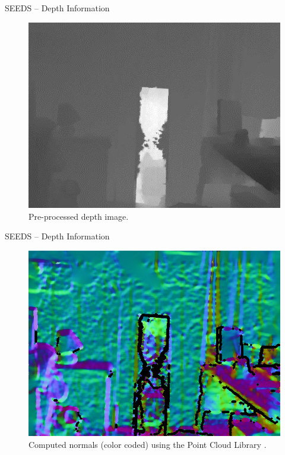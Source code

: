 \documentclass[handout]{beamer}
\begin{document}
	\begin{frame}{SEEDS -- Depth Information}
		\begin{figure}
   			\centering
   			\includegraphics[scale=0.439]{images/nyu-difficult-depth}
   			\caption{Pre-processed depth image.}
   		\end{figure}
	\end{frame}
	
	\begin{frame}{SEEDS -- Depth Information}
		\begin{figure}
   			\centering
   			\includegraphics[scale=0.33]{images/nyu-difficult-normal}
   			\caption{Computed normals (color coded) using the Point Cloud Library \cite{RusuCousins:2011}.}
   		\end{figure}
	\end{frame}
	
\end{document}

